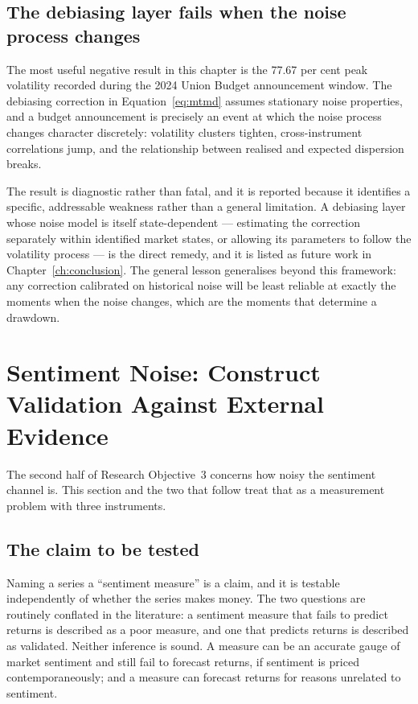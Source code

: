 \subsection{The debiasing layer fails when the noise process changes}

The most useful negative result in this chapter is the 77.67 per cent peak volatility recorded
during the 2024 Union Budget announcement window. The debiasing correction in
Equation~\eqref{eq:mtmd} assumes stationary noise properties, and a budget announcement is
precisely an event at which the noise process changes character discretely: volatility clusters
tighten, cross-instrument correlations jump, and the relationship between realised and expected
dispersion breaks.

The result is diagnostic rather than fatal, and it is reported because it identifies a specific,
addressable weakness rather than a general limitation. A debiasing layer whose noise model is
itself state-dependent --- estimating the correction separately within identified market states,
or allowing its parameters to follow the volatility process --- is the direct remedy, and it is
listed as future work in Chapter~\ref{ch:conclusion}. The general lesson generalises beyond this
framework: any correction calibrated on historical noise will be least reliable at exactly the
moments when the noise changes, which are the moments that determine a drawdown.

\section{Sentiment Noise: Construct Validation Against External Evidence}
\label{sec:sent-validity}

The second half of Research Objective~3 concerns how noisy the sentiment channel is. This section
and the two that follow treat that as a measurement problem with three instruments.

\subsection{The claim to be tested}

Naming a series a ``sentiment measure'' is a claim, and it is testable independently of whether
the series makes money. The two questions are routinely conflated in the literature: a sentiment
measure that fails to predict returns is described as a poor measure, and one that predicts
returns is described as validated. Neither inference is sound. A measure can be an accurate
gauge of market sentiment and still fail to forecast returns, if sentiment is priced
contemporaneously; and a measure can forecast returns for reasons unrelated to sentiment.

